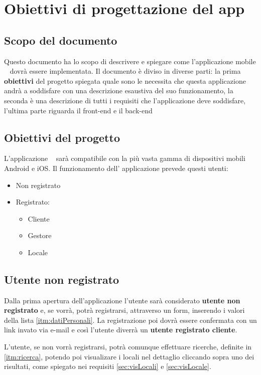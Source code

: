 \chapter{Obiettivi di progettazione del app \NameOfTheProject}

\section*{Scopo del documento}
Questo documento ha lo scopo di descrivere e spiegare come l'applicazione mobile \NameOfTheProject~ dovrà essere
implementata. Il documento è diviso in diverse parti: la prima \textbf{obiettivi} del progetto spiegata quale sono
le necessita che questa applicazione andrà a soddisfare con una descrizione esaustiva del suo funzionamento, la 
seconda è una descrizione di tutti i requisiti che l'applicazione deve soddisfare, l'ultima parte riguarda il 
front-end e il back-end

\section{Obiettivi del progetto}
L'applicazione \NameOfTheProject~ sarà compatibile con la più vasta gamma di dispositivi mobili Android e iOS. Il 
funzionamento dell' applicazione prevede questi utenti:
\begin{itemize}
    \item Non registrato 
    \item Registrato: \begin{itemize}
        \item Cliente
        \item Gestore
        \item Locale
    \end{itemize}
\end{itemize}

\section{Utente non registrato}

Dalla prima apertura dell'applicazione l'utente sarà considerato \textbf{utente non registrato} e, se vorrà, potrà
registrarsi, attraverso un form, inserendo i valori della lista \ref{itm:datiPersonali}.
La registrazione poi dovrà essere confermata con un link invato via e-mail e così l'utente diverrà un 
\textbf{utente registrato cliente}.

L'utente, se non vorrà registrarsi, potrà comunque effettuare ricerche, definite in \ref{itm:ricerca}, 
potendo poi visualizare i locali nel dettaglio cliccando sopra uno dei risultati, come spiegato nei requisiti 
\ref{sec:visLocali} e \ref{sec:visLocale}.

